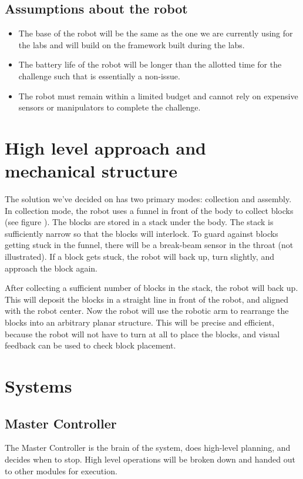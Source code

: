 \documentclass[letterpaper,11pt]{article}
\begin{document}
\subsection{Assumptions about the robot}
\begin{itemize}
 \item The base of the robot will be the same as the one we are currently using for the labs and will build on the framework built during the labs.  
 \item The battery life of the robot will be longer than the allotted time for the challenge such that is essentially a non-issue.
 \item The robot must remain within a limited budget and cannot rely on expensive sensors or manipulators to complete the challenge.
\end{itemize}

\section{High level approach and mechanical structure}
The solution we've decided on has two primary modes: collection and assembly.
In collection mode, the robot uses a funnel in front of the body to collect blocks (see figure ).
The blocks are stored in a stack under the body.
The stack is sufficiently narrow so that the blocks will interlock.
To guard against blocks getting stuck in the funnel,
there will be a break-beam sensor in the throat (not illustrated).
If a block gets stuck, the robot will back up, turn slightly, and approach the block again.

After collecting a sufficient number of blocks in the stack, the robot will back up.
This will deposit the blocks in a straight line in front of the robot, and aligned with the robot center.
Now the robot will use the robotic arm to rearrange the blocks into an arbitrary planar structure.
This will be precise and efficient, because the robot will not have to turn at all to place the blocks,
and visual feedback can be used to check block placement.

\section{Systems}

\subsection{Master Controller}
The Master Controller is the brain of the system, does high-level planning, and decides when to stop.
High level operations will be broken down and handed out to other modules for execution.
\end{document}
